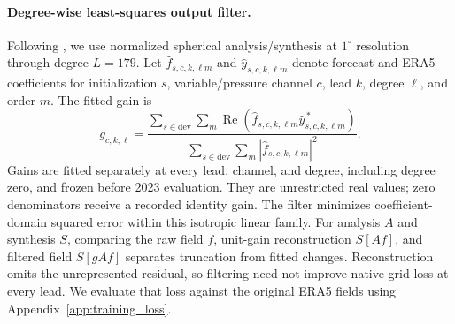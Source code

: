 \documentclass{article}
\newcommand{\vfourred}[1]{{\color{red}#1}}
\begin{document}
\paragraph{\vfourred{Degree-wise least-squares output filter.}}
\vfourred{Following \citet[Supplementary Section~7.4.2]{lam2023graphcast}, we use normalized spherical analysis/synthesis at $1^\circ$ resolution through degree $L=179$. Let $\widehat f_{s,c,k,\ell m}$ and $\widehat y_{s,c,k,\ell m}$ denote forecast and ERA5 coefficients for initialization $s$, variable/pressure channel $c$, lead $k$, degree $\ell$, and order $m$. The fitted gain is}
\vfourred{\begin{equation}
g_{c,k,\ell}=
\frac{\sum_{s\in\mathrm{dev}}\sum_m
       \operatorname{Re}(\widehat f_{s,c,k,\ell m}\widehat y_{s,c,k,\ell m}^{\,*})}
     {\sum_{s\in\mathrm{dev}}\sum_m |\widehat f_{s,c,k,\ell m}|^2}.
\label{eq:spectral_filter}
\end{equation}}
\vfourred{Gains are fitted separately at every lead, channel, and degree, including degree zero, and frozen before 2023 evaluation. They are unrestricted real values; zero denominators receive a recorded identity gain. The filter minimizes coefficient-domain squared error within this isotropic linear family. For analysis $A$ and synthesis $S$, comparing the raw field $f$, unit-gain reconstruction $S[A f]$, and filtered field $S[g A f]$ separates truncation from fitted changes. Reconstruction omits the unrepresented residual, so filtering need not improve native-grid loss at every lead. We evaluate that loss against the original ERA5 fields using Appendix~\ref{app:training_loss}.}
\end{document}
